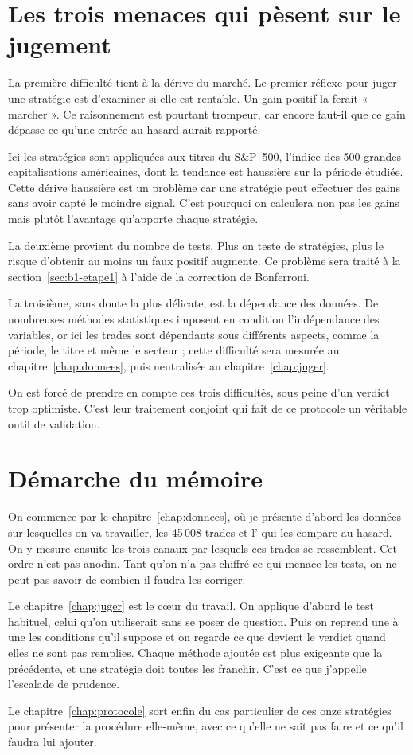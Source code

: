\section*{Les trois menaces qui pèsent sur le jugement}
\label{sec:menaces}


La première difficulté tient à la dérive du marché.
Le premier réflexe pour juger une stratégie est d'examiner si elle
est rentable. Un gain positif la ferait « marcher ». Ce raisonnement
est pourtant trompeur, car encore faut-il que ce gain dépasse ce
qu'une entrée au hasard aurait rapporté.

Ici les stratégies sont appliquées aux titres du S\&P~500,
l'indice des 500 grandes capitalisations américaines,
dont la tendance est haussière sur la période étudiée.
Cette dérive haussière est un problème car une stratégie peut effectuer
des gains sans avoir capté le moindre signal.
C'est pourquoi on calculera non pas les gains mais plutôt l'avantage
qu'apporte chaque stratégie.

La deuxième provient du nombre de tests. Plus on teste de stratégies,
plus le risque d'obtenir au moins un faux
positif augmente. Ce problème sera traité à la
section~\ref{sec:b1-etape1} à l'aide de la correction de Bonferroni.

La troisième, sans doute la plus délicate, est la dépendance
des données. De nombreuses méthodes statistiques
imposent en condition l'indépendance des variables, or ici les trades sont
dépendants sous différents aspects, comme la période, le titre et même le secteur ;
cette difficulté sera mesurée au chapitre~\ref{chap:donnees}, puis neutralisée
au chapitre~\ref{chap:juger}.

On est forcé de prendre en compte ces trois difficultés, sous peine
d'un verdict trop optimiste. C'est leur traitement conjoint qui fait de ce
protocole un véritable outil de validation.

\section*{Démarche du mémoire}
\label{sec:planification}


On commence par le chapitre~\ref{chap:donnees}, où je présente d'abord les
données sur lesquelles on va travailler, les 45\,008 trades et l'\edgevar{}
qui les compare au hasard. On y mesure ensuite les trois canaux par lesquels
ces trades se ressemblent. Cet ordre n'est pas anodin. Tant qu'on n'a pas
chiffré ce qui menace les tests, on ne peut pas savoir de combien il faudra
les corriger.

Le chapitre~\ref{chap:juger} est le cœur du travail. On applique d'abord le
test habituel, celui qu'on utiliserait sans se poser de question. Puis on
reprend une à une les conditions qu'il suppose et on regarde ce que devient le
verdict quand elles ne sont pas remplies. Chaque méthode ajoutée est plus
exigeante que la précédente, et une stratégie doit toutes les franchir. C'est
ce que j'appelle l'escalade de prudence.

Le chapitre~\ref{chap:protocole} sort enfin du cas particulier de ces onze
stratégies pour présenter la procédure elle-même, avec ce qu'elle ne sait pas
faire et ce qu'il faudra lui ajouter.

